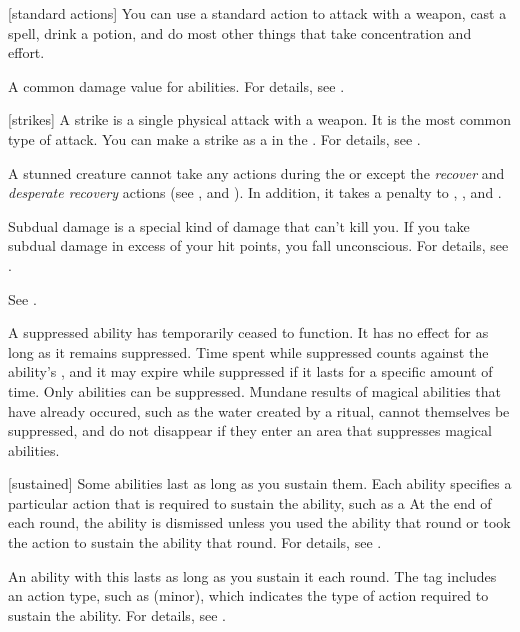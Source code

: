 [standard actions] You can use a standard action to attack with a weapon, cast a spell, drink a potion, and do most other things that take concentration and effort.

 A common damage value for abilities.
For details, see .

[strikes] A strike is a single physical attack with a weapon.
It is the most common type of attack.
You can make a strike as a  in the .
For details, see .

 A stunned creature cannot take any actions during the  or  except the \textit{recover} and \textit{desperate recovery} actions (see , and ).
In addition, it takes a  penalty to , , and .

 Subdual damage is a special kind of damage that can't kill you.
If you take subdual damage in excess of your hit points, you fall unconscious.
For details, see .

 See .

 A suppressed ability has temporarily ceased to function.
It has no effect for as long as it remains suppressed.
Time spent while suppressed counts against the ability's , and it may expire while suppressed if it lasts for a specific amount of time.
Only  abilities can be suppressed.
Mundane results of magical abilities that have already occured, such as the water created by a  ritual, cannot themselves be suppressed, and do not disappear if they enter an area that suppresses magical abilities.

[sustained] Some abilities last as long as you sustain them.
Each ability specifies a particular action that is required to sustain the ability, such as a 
At the end of each round, the ability is dismissed unless you used the ability that round or took the action to sustain the ability that round.
For details, see .

 An ability with this  lasts as long as you sustain it each round.
The tag includes an action type, such as (minor), which indicates the type of action required to sustain the ability.
For details, see .

